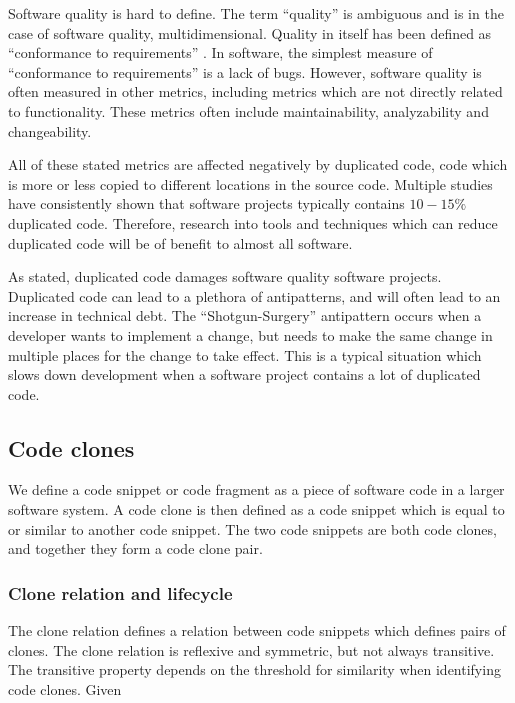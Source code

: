 \documentclass[12pt]{article}
\begin{document}
Software quality is hard to define. The term ``quality'' is ambiguous and is in the case
of software quality, multidimensional. Quality in itself has been defined as ``conformance
to requirements'' \cite[8]{crosby1980quality}. In software, the simplest measure of
``conformance to requirements'' is a lack of bugs. However, software
quality is often measured in other metrics, including metrics which are not directly
related to functionality\cite[29]{MetricsAndModelsInSoftwareQuality}. These metrics
often include maintainability, analyzability and changeability.

All of these stated metrics are affected negatively by duplicated code, code which is more
or less copied to different locations in the source code. Multiple studies have consistently
shown that software projects typically contains $10-15\%$ duplicated
code\cite{CloningByAccident}. Therefore, research into tools and techniques which can
reduce duplicated code will be of benefit to almost all software.

As stated, duplicated code damages software quality software projects. Duplicated code can
lead to a plethora of antipatterns, and will often lead to an
increase in technical debt. The ``Shotgun-Surgery''\cite[66]{fowlerrefactoring} antipattern
occurs when a developer wants to implement a change, but needs to make the same change in
multiple places for the change to take effect. This is a typical situation which slows down
development when a software project contains a lot of duplicated code.

\subsection{Code clones}

We define a code snippet or code fragment as a piece of software code in a larger software
system. A code clone is then defined as a code snippet which is equal to or similar to
another code snippet. The two code snippets are both code clones, and together they form a
code clone pair.

\subsubsection{Clone relation and lifecycle}

The clone relation defines a relation between code snippets which defines pairs of clones.
The clone relation is reflexive and symmetric, but not always transitive. The transitive
property depends on the threshold for similarity when identifying code clones. Given
\end{document}
